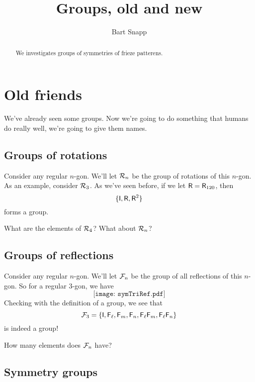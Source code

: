 \documentclass{ximera}
\title{Groups, old and new}
\author{Bart Snapp}
\begin{document}
\begin{abstract}
  We investigates groups of symmetries of frieze patterens.
\end{abstract}
\maketitle





\section{Old friends}


We've already seen some groups. Now we're going to do something
that humans do really well, we're going to give them names.

\subsection{Groups of rotations}

Consider any regular $n$-gon. We'll let $\mathcal R_n$ be the group of
rotations of this $n$-gon. As an example, consider $\mathcal R_3$. As we've seen
before, if we let $\mathsf{R} = \mathsf{R}_{120}$, then 
\[
\{\mathsf{I}, \mathsf{R}, \mathsf{R}^2\}
\]
forms a group. 

\begin{question}
What are the elements of $\mathcal R_4$? What about $\mathcal R_n$?
\end{question}


\subsection{Groups of reflections}

Consider any regular $n$-gon. We'll let $\mathcal F_n$ be the group of all
reflections of this $n$-gon. So for a regular $3$-gon, we have
\[
\texttt{[image: symTriRef.pdf]}
\]
Checking with the definition of a group, we see that 
\[
\mathcal F_3 = \{ \mathsf{I}, \mathsf{F}_\ell, \mathsf{F}_m, \mathsf{F}_n, \mathsf{F}_\ell\mathsf{F}_m,\mathsf{F}_\ell\mathsf{F}_n\}
\]
is indeed a group!

\begin{question}
How many elements does $\mathcal F_n$ have?
\end{question}




\subsection{Symmetry groups}
\end{document}
